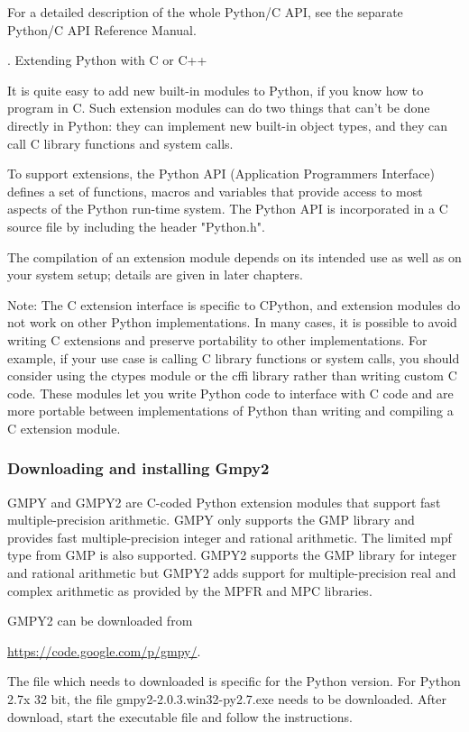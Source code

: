 For a detailed description of the whole Python/C API, see the separate Python/C API Reference Manual.

. Extending Python with C or C++

It is quite easy to add new built-in modules to Python, if you know how to program in C. Such extension modules can do two things that can’t be done directly in Python: they can implement new built-in object types, and they can call C library functions and system calls.

To support extensions, the Python API (Application Programmers Interface) defines a set of functions, macros and variables that provide access to most aspects of the Python run-time system. The Python API is incorporated in a C source file by including the header "Python.h".

The compilation of an extension module depends on its intended use as well as on your system setup; details are given in later chapters.

Note:
The C extension interface is specific to CPython, and extension modules do not work on other Python implementations. In many cases, it is possible to avoid writing C extensions and preserve portability to other implementations. For example, if your use case is calling C library functions or system calls, you should consider using the ctypes module or the cffi library rather than writing custom C code. These modules let you write Python code to interface with C code and are more portable between implementations of Python than writing and compiling a C extension module.


\subsubsection{Downloading and installing Gmpy2}

GMPY and GMPY2 are C-coded Python extension modules that support fast multiple-precision arithmetic. GMPY only supports the GMP library and provides fast multiple-precision integer and rational arithmetic. The limited mpf type from GMP is also supported. GMPY2 supports the GMP library for integer and rational arithmetic but GMPY2 adds support for multiple-precision real and complex arithmetic as provided by the MPFR and MPC libraries. 

GMPY2 can be downloaded from

\vpara
\href{https://code.google.com/p/gmpy/}{https://code.google.com/p/gmpy/}.

The file which needs to downloaded is specific for the Python version. For Python 2.7x 32 bit, the file gmpy2-2.0.3.win32-py2.7.exe needs to be downloaded. After download, start the executable file and follow the instructions.

